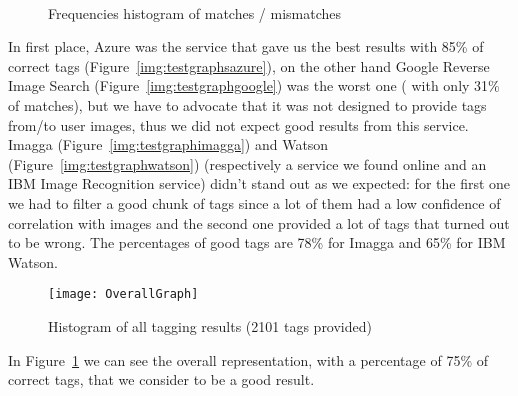 \begin{figure}[htp]
\centering
    \hfill
    \\
    \hfill
    \caption{Frequencies histogram of matches / mismatches}
\end{figure}

In first place, Azure was the service that gave us the best results with 85\% 
of correct tags (Figure~\ref{img:testgraphsazure}), on the other hand Google 
Reverse Image Search (Figure~\ref{img:testgraphgoogle}) was the worst one (
with only 31\% of matches), but we have to advocate that it was not designed 
to provide tags from/to user images, thus we did not expect good results from 
this service.
Imagga (Figure~\ref{img:testgraphimagga}) and Watson 
(Figure~\ref{img:testgraphwatson}) (respectively a service we found online and 
an IBM Image Recognition service) didn't stand out as we expected: for the 
first one we had to filter a good chunk of tags since a lot of them had a low 
confidence of correlation with images and the second one provided a lot of 
tags that turned out to be wrong. The percentages of good tags are 78\% for 
Imagga and 65\% for IBM Watson.

\begin{figure}[H]
\centering
\texttt{[image: OverallGraph]}
\caption{Histogram of all tagging results (2101 tags provided)}
\label{img:testgraphoverall}
\end{figure}

In Figure~\ref{img:testgraphoverall} we can see the overall representation, 
with a percentage of 75\% of correct tags, that we consider to be a good 
result.

\begin{figure}[htp]
\centering
    \hfill
\end{figure}

